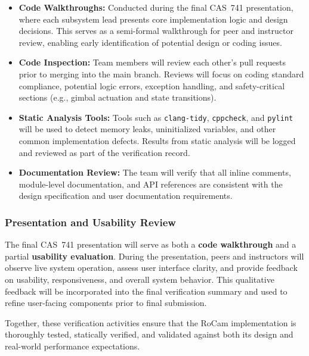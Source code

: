 \documentclass[12pt, titlepage]{article}
\begin{document}
\begin{itemize}
    \item \textbf{Code Walkthroughs:}  
    Conducted during the final CAS~741 presentation, where each 
    subsystem lead presents core implementation logic and design decisions. 
    This serves as a semi-formal walkthrough for peer and instructor 
    review, enabling early identification of potential design or coding issues.

    \item \textbf{Code Inspection:}  
    Team members will review each other’s pull requests prior to 
    merging into the main branch.  
    Reviews will focus on coding standard compliance, potential 
    logic errors, exception handling, and safety-critical sections 
    (e.g., gimbal actuation and state transitions).

    \item \textbf{Static Analysis Tools:}  
    Tools such as \texttt{clang-tidy}, \texttt{cppcheck}, and 
    \texttt{pylint} will be used to detect memory leaks, uninitialized variables, 
    and other common implementation defects. 
    Results from static analysis will be logged and reviewed 
    as part of the verification record.

    \item \textbf{Documentation Review:}  
    The team will verify that all inline comments, module-level 
    documentation, and API references are consistent with the design 
    specification and user documentation requirements.
\end{itemize}

\subsubsection*{Presentation and Usability Review}
The final CAS~741 presentation will serve as both a 
\textbf{code walkthrough} and a partial \textbf{usability evaluation}.  
During the presentation, peers and instructors will observe live 
system operation, assess user interface clarity, and provide 
feedback on usability, responsiveness, and overall system behavior.  
This qualitative feedback will be incorporated into the final 
verification summary and used to refine user-facing components 
prior to final submission.

\noindent
Together, these verification activities ensure that the RoCam 
implementation is thoroughly tested, statically verified, and 
validated against both its design and real-world performance expectations.
\end{document}
